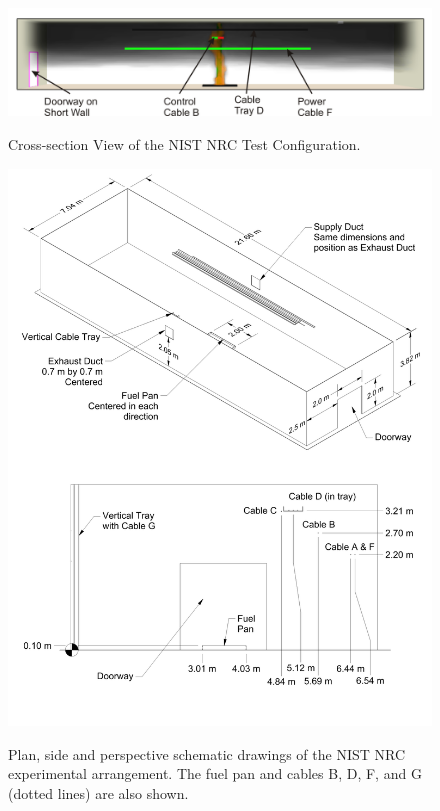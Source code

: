\begin{figure}[\figoptions{t}]
\begin{center}
\includegraphics[width=5.0in]{FIGURES/NIST_NRC/NISTNRC_Summary}\\
\end{center}
\caption{Cross-section View of the NIST NRC Test Configuration.}
 \label{fig:NISTNRC_Summary}
\end{figure}

\begin{figure}[\figoptions{t}]
\begin{center}
\includegraphics[width=6.5in]{FIGURES/NIST_NRC/NIST_NRC_Drawing}\\
\end{center}
\caption{Plan, side and perspective schematic drawings of the NIST NRC experimental arrangement. The fuel pan and cables B, D, F, and G (dotted lines) are also shown.}
 \label{fig:NISTNRC_Detailed}
\end{figure}

